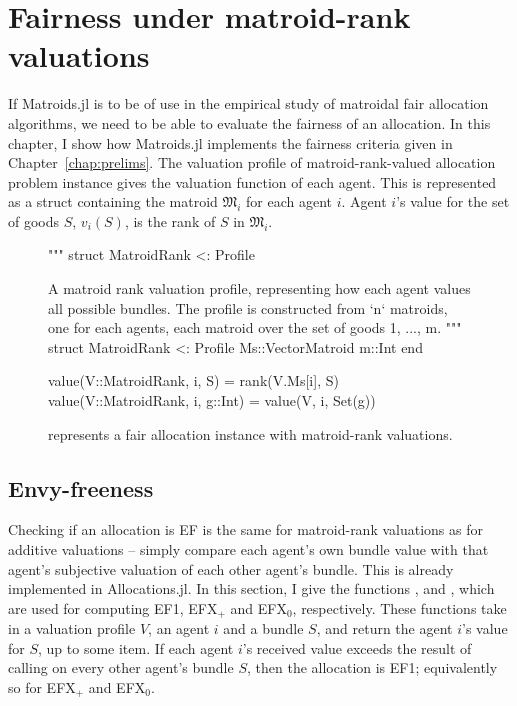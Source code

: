 \section{Fairness under matroid-rank valuations}
\label{sec:fairness-impl}
If Matroids.jl is to be of use in the empirical study of matroidal fair allocation algorithms, we need to be able to evaluate the fairness of an allocation. In this chapter, I show how Matroids.jl implements the fairness criteria given in Chapter~\ref{chap:prelims}. The valuation profile of matroid-rank-valued allocation problem instance gives the valuation function of each agent. This is represented as a struct containing the matroid $\mathfrak{M}_i$ for each agent $i$. Agent $i$'s value for the set of goods $S$, $v_i(S)$, is the rank of $S$ in $\mathfrak{M}_i$.
\begin{figure}[ht!]
\begin{jllisting}
"""
    struct MatroidRank <: Profile

A matroid rank valuation profile, representing how each agent values all possible bundles. The profile is constructed from `n` matroids, one for each agents, each matroid over the set of goods {1, ..., m}. 
"""
struct MatroidRank <: Profile
    Ms::Vector{Matroid}
    m::Int
end

value(V::MatroidRank, i, S) = rank(V.Ms[i], S)
value(V::MatroidRank, i, g::Int) = value(V, i, Set(g))
\end{jllisting}
\caption{ represents a fair allocation instance with matroid-rank valuations.}
\end{figure}

\subsection*{Envy-freeness}
Checking if an allocation is EF is the same for matroid-rank valuations as for additive valuations -- simply compare each agent's own bundle value with that agent's subjective valuation of each other agent's bundle. This is already implemented in Allocations.jl. In this section, I give the functions ,  and , which are used for computing EF1, EFX$_+$ and EFX$_0$, respectively. These functions take in a valuation profile $V$, an agent $i$ and a bundle $S$, and return the agent $i$'s value for $S$, up to some item. If each agent $i$'s received value exceeds the result of calling  on every other agent's bundle $S$, then the allocation is EF1; equivalently so for EFX$_+$ and EFX$_0$. 

